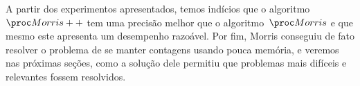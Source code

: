 A partir dos experimentos apresentados, temos indícios que o algoritmo~$\Morrispp$ tem uma precisão melhor que o 
algoritmo~$\Morris$ e que mesmo este apresenta um desempenho razoável. Por fim, Morris conseguiu de fato resolver o 
problema de se manter contagens usando pouca memória, e veremos nas próximas seções, como a solução dele permitiu que
problemas mais difíceis e relevantes fossem resolvidos.
 